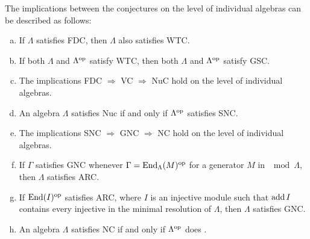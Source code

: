 \begin{prop}\label{prop:conj_on_individual_algebras}
	The implications between the conjectures on the level of individual algebras can be described as follows: 
	\begin{enumerate}[a)]
		\item If $\Lambda$ satisfies FDC, then $\Lambda$ also satisfies WTC.
		\item If both $\Lambda$ and $\Lambda^{\operatorname{op}}$ satisfy WTC, then both $\Lambda$ and $\Lambda^{\operatorname{op}}$ satisfy GSC.
		\item The implications FDC $\Rightarrow$ VC $\Rightarrow$ NuC hold on the level of individual algebras.
		\item An algebra $\Lambda$ satisfies Nuc if and only if $\Lambda^{\operatorname{op}}$ satisfies SNC.
		\item The implications SNC $\Rightarrow$ GNC $\Rightarrow$ NC hold on the level of individual algebras.
		\item If $\Gamma$ satisfies GNC whenever $\Gamma = \operatorname{End}_\Lambda(M)^{\operatorname{op}}$ for a generator $M$ in $\mod\Lambda$, then $\Lambda$ satisfies ARC.
		\item If $\operatorname{End}(I)^{\operatorname{op}}$ satisfies ARC, where $I$ is an injective module such that $\operatorname{add} I$ contains every injective in the minimal resolution of $\Lambda$, then $\Lambda$ satisfies GNC.
		\item An algebra $\Lambda$ satisfies NC if and only if $\Lambda^{\operatorname{op}}$ does \cite[Theorem~4]{Mu68}.
	\end{enumerate}
\end{prop}

%
